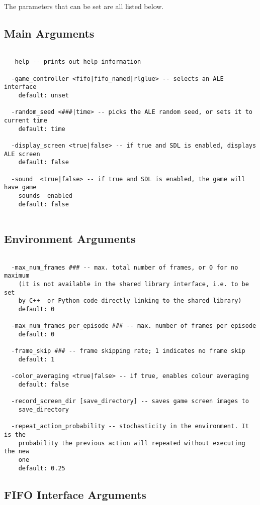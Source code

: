 \documentclass[12pt]{article}
\begin{document}
The parameters that can be set are all listed below.

\subsection{Main Arguments}
\small{
\begin{verbatim}

  -help -- prints out help information

  -game_controller <fifo|fifo_named|rlglue> -- selects an ALE interface
    default: unset

  -random_seed <###|time> -- picks the ALE random seed, or sets it to current time
    default: time

  -display_screen <true|false> -- if true and SDL is enabled, displays ALE screen
    default: false
    
  -sound  <true|false> -- if true and SDL is enabled, the game will have game
    sounds  enabled
    default: false


\end{verbatim}
}

\subsection{Environment Arguments}

\small{
\begin{verbatim}

  -max_num_frames ### -- max. total number of frames, or 0 for no maximum 
    (it is not available in the shared library interface, i.e. to be set 
    by C++  or Python code directly linking to the shared library)
    default: 0

  -max_num_frames_per_episode ### -- max. number of frames per episode
    default: 0

  -frame_skip ### -- frame skipping rate; 1 indicates no frame skip 
    default: 1

  -color_averaging <true|false> -- if true, enables colour averaging 
    default: false

  -record_screen_dir [save_directory] -- saves game screen images to
    save_directory
     
  -repeat_action_probability -- stochasticity in the environment. It is the
    probability the previous action will repeated without executing the new
    one
    default: 0.25
\end{verbatim}
}

\subsection{FIFO Interface Arguments}
\end{document}
